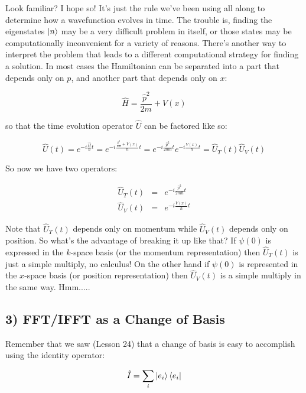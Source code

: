 \documentclass[11pt]{article} %
\begin{document}
Look familiar? I hope so! It's just the rule we've been using all along to determine how a wavefunction evolves in time. The trouble is, finding the eigenstates $\ket{n}$ may be a very difficult problem in itself, or those states may be computationally inconvenient for a variety of reasons. There's another way to interpret the problem that leads to a different computational strategy for finding a solution. In most cases the Hamiltonian can be separated into a part that depends only on $p$, and another part that depends only on $x$:

\begin{equation}
\hat{H} = \frac{\hat{p}^2}{2m} + V(x)
\end{equation}

so that the time evolution operator $\hat{U}$ can be factored like so:

\begin{equation}
\hat{U}(t) = e^{-i\frac{\hat{H}}{\hbar} t} = 
e^{-i\frac{\frac{\hat{p}^2}{2m} + V(x)}{\hbar} t}= 
e^{-i{\frac{\hat{p}^2}{2m\hbar}t}}e^{-i\frac{V(x)}{\hbar}t} =
\hat{U}_T(t)\hat{U}_V(t)
\end{equation}

So now we have two operators:

\begin{eqnarray}
\hat{U}_T(t)  &=& e^{-i{\frac{\hat{p}^2}{2m\hbar}t}}\\
\hat{U}_V(t)  &=& e^{-i\frac{V(x)}{\hbar}t}
\end{eqnarray}

Note that $\hat{U}_T(t)$ depends only on momentum while $\hat{U}_V(t)$ depends only on position. So what's the advantage of breaking it up like that? If $\psi(0)$ is expressed in the $k$-space basis (or the momentum representation) then $\hat{U}_T(t)$ is just a simple multiply, no calculus! On the other hand if $\psi(0)$ is represented in the $x$-space basis (or position representation) then $\hat{U}_V(t)$ is a simple multiply in the same way. Hmm.....


\subsection*{3) FFT/IFFT as a Change of Basis}

Remember that we saw (Lesson 24) that a change of basis is easy to accomplish using the identity operator:

\begin{equation}
\hat{I} = \sum_i \ket{e_i}\bra{e_i}
\end{equation}
\end{document}
